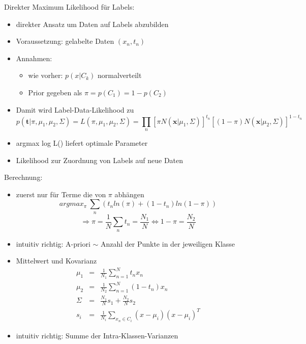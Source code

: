 	Direkter Maximum Likelihood für Labels:
	\begin{itemize}
		\item direkter Ansatz um Daten auf Labels abzubilden
		\item Voraussetzung: gelabelte Daten $(x_n,t_n)$
		\item Annahmen:
		\begin{itemize}
			\item wie vorher: $p(x\vert C_k)$ normalverteilt
			\item Prior gegeben als $\pi = p(C_1) = 1-p(C_2)$
		\end{itemize}
		\item Damit wird Label-Data-Likelihood zu
		\begin{equation*}
			p(\pmb{t}\vert \pi, \mu_1, \mu_2, \Sigma) =L(\pi, \mu_1, \mu_2, \Sigma) = \prod_n [\pi N(\pmb{x}\vert \mu_1, \Sigma)]^{t_n}[(1-\pi)N(\pmb{x}\vert \mu_2,\Sigma)]^{1-t_n}
		\end{equation*}
		\item argmax log L() liefert optimale Parameter
		\item Likelihood zur Zuordnung von Labels auf neue Daten
	\end{itemize}
	Berechnung:
	\begin{itemize}
		\item zuerst nur für Terme die von $\pi$ abhängen
		\begin{equation*}
			argmax_\pi ~ \sum_n(t_nln(\pi)+(1-t_n)ln(1-\pi))
		\end{equation*}
		\begin{equation*}
			\Rightarrow \pi = \frac{1}{N}\sum_n t_n = \frac{N_1}{N} \Leftrightarrow 1-\pi = \frac{N_2}{N}
		\end{equation*}
		\item intuitiv richtig: A-priori $\sim$ Anzahl der Punkte in der jeweiligen Klasse
		\item Mittelwert und Kovarianz
		\begin{eqnarray*}
			\mu_1 &=& \frac{1}{N_1}\sum_{n=1}^Nt_nx_n\\
			\mu_2 &=& \frac{1}{N_2}\sum_{n=1}^N(1-t_n)x_n\\
			\Sigma &=& \frac{N_1}{N}s_1+\frac{N_2}{N}s_2\\
			s_i &=& \frac{1}{N_i}\sum_{x_n \in C_i}(x-\mu_i)(x-\mu_i)^T
		\end{eqnarray*}
		\item intuitiv richtig: Summe der Intra-Klassen-Varianzen
	\end{itemize}
